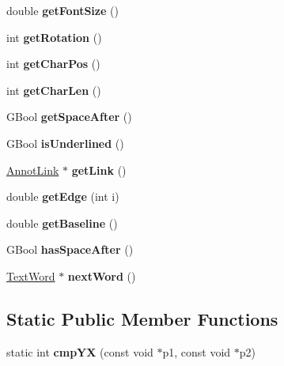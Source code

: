 \begin{DoxyCompactItemize}
\item 
\mbox{\label{class_text_word_a3bf64f09a394ed2846a89b14273c98dc}} 
double {\bfseries get\+Font\+Size} ()
\item 
\mbox{\label{class_text_word_af6207e5e0cdd70b4dc15a72f52f1e8a4}} 
int {\bfseries get\+Rotation} ()
\item 
\mbox{\label{class_text_word_a1578e60327558ea35b0aa3a2d51593c4}} 
int {\bfseries get\+Char\+Pos} ()
\item 
\mbox{\label{class_text_word_a93570732c29db97e29a366ddf2273493}} 
int {\bfseries get\+Char\+Len} ()
\item 
\mbox{\label{class_text_word_aa5079eded6b31d30afbcc1c7d7ca62aa}} 
G\+Bool {\bfseries get\+Space\+After} ()
\item 
\mbox{\label{class_text_word_ad68f4dd87f7880b720cdf768a1e931ae}} 
G\+Bool {\bfseries is\+Underlined} ()
\item 
\mbox{\label{class_text_word_a42bfb9524f14e091aaa0a9e13cdf9a88}} 
\hyperlink{class_annot_link}{Annot\+Link} $\ast$ {\bfseries get\+Link} ()
\item 
\mbox{\label{class_text_word_afed60c39502136a72a117f7e0e9fa404}} 
double {\bfseries get\+Edge} (int i)
\item 
\mbox{\label{class_text_word_a213ff4961527812e7d3cb7468698aee2}} 
double {\bfseries get\+Baseline} ()
\item 
\mbox{\label{class_text_word_aadf05b7f5dd3cbeefb9d91cd7412de11}} 
G\+Bool {\bfseries has\+Space\+After} ()
\item 
\mbox{\label{class_text_word_a6bcf430bda7ac742cf585465e17841a9}} 
\hyperlink{class_text_word}{Text\+Word} $\ast$ {\bfseries next\+Word} ()
\end{DoxyCompactItemize}
\subsection*{Static Public Member Functions}
\begin{DoxyCompactItemize}
\item 
\mbox{\label{class_text_word_a4a7cc627f0baa7da1ff266c8072f22ef}} 
static int {\bfseries cmp\+YX} (const void $\ast$p1, const void $\ast$p2)
\end{DoxyCompactItemize}
